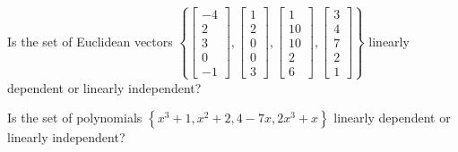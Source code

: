 \begin{applicationActivities}
\begin{activity}{5}
  Is the set of Euclidean vectors \(\left\{
  \begin{bmatrix}-4\\2\\3\\0\\-1\end{bmatrix},
  \begin{bmatrix}1\\2\\0\\0\\3\end{bmatrix},
  \begin{bmatrix}1\\10\\10\\2\\6\end{bmatrix},
  \begin{bmatrix}3\\4\\7\\2\\1\end{bmatrix}
  \right\}\) linearly dependent or linearly independent?
\end{activity}

\begin{activity}{10}
  Is the set of polynomials \(\left\{
  x^3+1,x^2+2,4-7x,2x^3+x
  \right\}\) linearly dependent or linearly independent?
\end{activity}

\end{applicationActivities}
